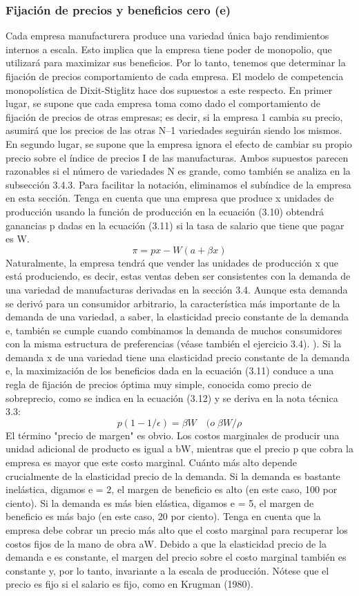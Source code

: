 \subsubsection{Fijación de precios y beneficios cero (e)}
Cada empresa manufacturera produce una variedad única bajo rendimientos internos a escala. Esto implica que la empresa tiene poder de monopolio, que utilizará para maximizar sus beneficios. Por lo tanto, tenemos que determinar la fijación de precios comportamiento de cada empresa. El modelo de competencia monopolística de Dixit-Stiglitz hace dos supuestos a este respecto. En primer lugar, se supone que cada empresa toma como dado el comportamiento de fijación de precios de otras empresas; es decir, si la empresa 1 cambia su precio, asumirá que los precios de las otras N–1 variedades seguirán siendo los mismos. En segundo lugar, se supone que la empresa ignora el efecto de cambiar su propio precio sobre el índice de precios I de las manufacturas. Ambos supuestos parecen razonables si el número de variedades N es grande, como también se analiza en la subsección 3.4.3. Para facilitar la notación, eliminamos el subíndice de la empresa en esta sección. Tenga en cuenta que una empresa que produce x unidades de producción usando la función de producción en la ecuación (3.10) obtendrá ganancias p dadas en la ecuación (3.11) si la tasa de salario que tiene que pagar es W.
$$\pi=px-W(a+\beta x)$$
Naturalmente, la empresa tendrá que vender las unidades de producción x que está produciendo, es decir, estas ventas deben ser consistentes con la demanda de una variedad de manufacturas derivadas en la sección 3.4. Aunque esta demanda se derivó para un consumidor arbitrario, la característica más importante de la demanda de una variedad, a saber, la elasticidad precio constante de la demanda e, también se cumple cuando combinamos la demanda de muchos consumidores con la misma estructura de preferencias (véase también el ejercicio 3.4). ). Si la demanda x de una variedad tiene una elasticidad precio constante de la demanda e, la maximización de los beneficios dada en la ecuación (3.11) conduce a una regla de fijación de precios óptima muy simple, conocida como precio de sobreprecio, como se indica en la ecuación (3.12) y se deriva en la nota técnica 3.3:
$$p(1-1/\epsilon)=\beta W \quad (o\; \beta W/ \rho$$
El término "precio de margen" es obvio. Los costos marginales de producir una unidad adicional de producto es igual a bW, mientras que el precio p que cobra la empresa es mayor que este costo marginal. Cuánto más alto depende crucialmente de la elasticidad precio de la demanda. Si la demanda es bastante inelástica, digamos e = 2, el margen de beneficio es alto (en este caso, 100 por ciento). Si la demanda es más bien elástica, digamos e = 5, el margen de beneficio es más bajo (en este caso, 20 por ciento). Tenga en cuenta que la empresa debe cobrar un precio más alto que el costo marginal para recuperar los costos fijos de la mano de obra aW. Debido a que la elasticidad precio de la demanda e es constante, el margen del precio sobre el costo marginal también es constante y, por lo tanto, invariante a la escala de producción. Nótese que el precio es fijo si el salario es fijo, como en Krugman (1980).\\
